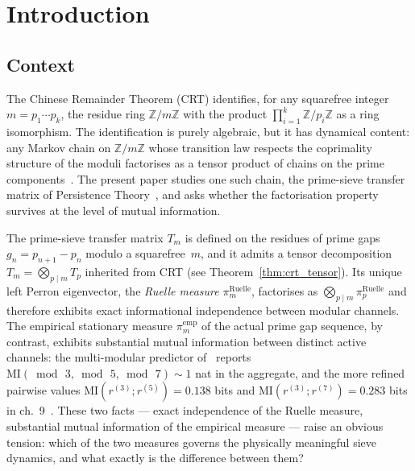 \section{Introduction}
\label{sec:intro}

\subsection{Context}
\label{ssec:context}

The Chinese Remainder Theorem (CRT) identifies, for any squarefree
integer $m = p_1 \cdots p_k$, the residue ring
$\mathbb{Z}/m\mathbb{Z}$ with the product
$\prod_{i=1}^{k} \mathbb{Z}/p_i\mathbb{Z}$ as a ring isomorphism. The
identification is purely algebraic, but it has dynamical content: any
Markov chain on $\mathbb{Z}/m\mathbb{Z}$ whose transition law respects
the coprimality structure of the moduli factorises as a tensor product
of chains on the prime components~\cite{Seneta2006,Walters1982}. The
present paper studies one such chain, the prime-sieve transfer matrix
of Persistence Theory~\cite{PT_MATHEMATICS_M1,PT_Monograph}, and asks
whether the factorisation property survives at the level of mutual
information.

The prime-sieve transfer matrix $T_m$ is defined on the residues of
prime gaps $g_n = p_{n+1} - p_n$ modulo a squarefree~$m$, and it
admits a tensor decomposition $T_m = \bigotimes_{p \mid m} T_p$
inherited from CRT (see Theorem~\ref{thm:crt_tensor}). Its unique
left Perron eigenvector, the \emph{Ruelle measure}
$\pi_m^{\mathrm{Ruelle}}$, factorises as
$\bigotimes_{p \mid m} \pi_p^{\mathrm{Ruelle}}$ and therefore exhibits
exact informational independence between modular channels. The
empirical stationary measure $\pi_m^{\mathrm{emp}}$ of the actual
prime gap sequence, by contrast, exhibits substantial mutual
information between distinct active channels: the multi-modular
predictor of~\cite[Ch.~math\_structures]{PT_Monograph} reports
$\mathrm{MI}(\bmod\,3, \bmod\,5, \bmod\,7) \sim 1$ nat in the
aggregate, and the more refined pairwise values
$\mathrm{MI}(r^{(3)}; r^{(5)}) = 0.138$ bits and
$\mathrm{MI}(r^{(3)}; r^{(7)}) = 0.283$ bits in
ch.~9~\cite[S15.6.259]{PT_Monograph}. These two facts --- exact
independence of the Ruelle measure, substantial mutual information of
the empirical measure --- raise an obvious tension: which of the two
measures governs the physically meaningful sieve dynamics, and what
exactly is the difference between them?


